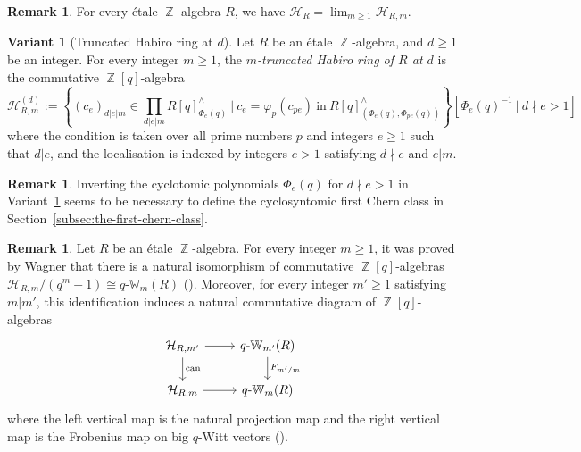\documentclass[10pt,twoside]{scrarticle}
\newlength{\mar} \setlength{\mar}{1cm}%
\newlength{\len}
\theoremstyle{definition}
\newtheorem{remark}[theorem]{Remark}
\newtheorem{variant}[theorem]{Variant}
\DeclareMathOperator{\Z}{\mathbb{Z}}
\newcommand{\qWm}{q\text{-}\mathbb{W}_m}
\renewcommand{\ge}{\geqslant}
\renewcommand{\geq}{\geqslant}
\numberwithin{equation}{theorem}
\begin{document}
\begin{remark}
    For every étale $\Z$-algebra $R$, we have $\mathcal{H}_R = \lim_{m \ge 1} \mathcal{H}_{R,m}$.
\end{remark}

\begin{variant}[Truncated Habiro ring at $d$]\label{variantHabiroringatd} 
    Let $R$ be an étale $\Z$-algebra, 
    and $d\geq 1$ be an integer. For every integer $m \ge 1$, the \emph{$m$-truncated Habiro ring of $R$ at $d$} is the commutative $\Z[q]$-algebra
    $$\mathcal{H}_{R,m}^{(d)}:=\left\{(c_e)_{d|e|m} \in \prod_{d|e|m}{R[q]^\wedge_{\Phi_e(q)}}~\bigg |~c_e = \varphi_p(c_{p e})~\text{in}~R[q]^\wedge_{(\Phi_{e}(q),\Phi_{pe}(q))}\right\}\left[\Phi_e(q)^{-1}~\big|~d \nmid e>1\right]$$
    where the condition is taken over all prime numbers $p$ and integers $e \ge 1$ such that $d|e$, and the localisation is indexed by integers $e>1$ satisfying $d \nmid e$ and $e|m$.
\end{variant}

\begin{remark}
    Inverting the cyclotomic polynomials $\Phi_e(q)$ for $d \nmid e > 1$ in Variant~\ref{variantHabiroringatd} seems to be necessary to define the cyclosyntomic first Chern class in Section~\ref{subsec:the-first-chern-class}.
\end{remark}

\begin{remark}\label{remarkHabiroqWitt}
    Let $R$ be an \'etale $\Z$-algebra. For every integer $m \ge 1$, it was proved by Wagner that there is a natural isomorphism of commutative $\Z[q]$-algebras $\mathcal{H}_{R,m}/(q^m-1) \cong \qWm(R)$ (\cite[Theorem~$2.9$]{wagner_q-hodge_2025}). Moreover, for every integer $m' \ge 1$ satisfying $m|m'$, this identification induces a natural commutative diagram of $\Z[q]$-algebras 
    \[
    \begin{tikzcd}
    \mathcal{H}_{R,m'} \arrow[r]\arrow[d,"\text{can}"] & q\text{-}\mathbb{W}_{m'}(R) \arrow[d,"F_{m'/m}"] \\
    \mathcal{H}_{R,m} \arrow[r] & \qWm(R)
    \end{tikzcd}
    \]
    where the left vertical map is the natural projection map and the right vertical map is the Frobenius map on big $q$-Witt vectors (\cite[Remark~2.10]{wagner_q-hodge_2025}). 
\end{remark}
\end{document}
